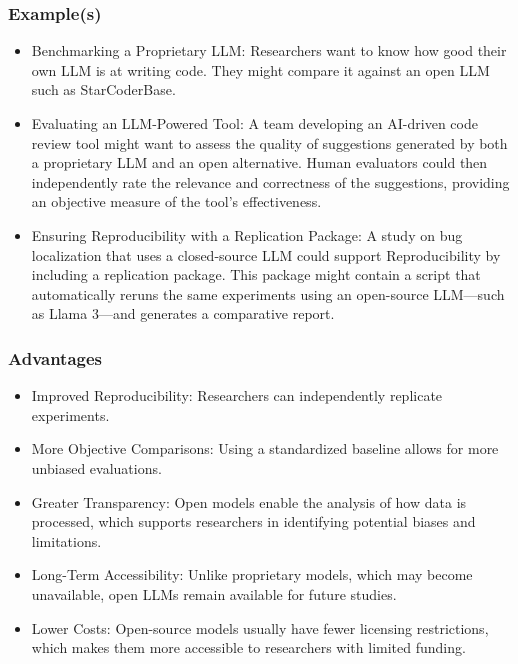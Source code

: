 \subsubsection{Example(s)}


\begin{itemize}
    \item Benchmarking a Proprietary LLM: Researchers want to know how good their own LLM is at writing code. They might compare it against an open LLM such as StarCoderBase.
    \item Evaluating an LLM-Powered Tool: A team developing an AI-driven code review tool might want to assess the quality of suggestions generated by both a proprietary LLM and an open alternative. Human evaluators could then independently rate the relevance and correctness of the suggestions, providing an objective measure of the tool's effectiveness.
    \item Ensuring Reproducibility with a Replication Package: A study on bug localization that uses a closed-source LLM could support Reproducibility by including a replication package. This package might contain a script that automatically reruns the same experiments using an open-source LLM—such as Llama 3—and generates a comparative report.
\end{itemize}

\subsubsection{Advantages}


\begin{itemize}
    \item	Improved Reproducibility: Researchers can independently replicate experiments.
    \item	More Objective Comparisons: Using a standardized baseline allows for more unbiased evaluations.
    \item	Greater Transparency: Open models enable the analysis of how data is processed, which supports researchers in identifying potential biases and limitations.
    \item	Long-Term Accessibility: Unlike proprietary models, which may become unavailable, open LLMs remain available for future studies.
    \item	Lower Costs: Open-source models usually have fewer licensing restrictions, which makes them more accessible to researchers with limited funding.
\end{itemize}



